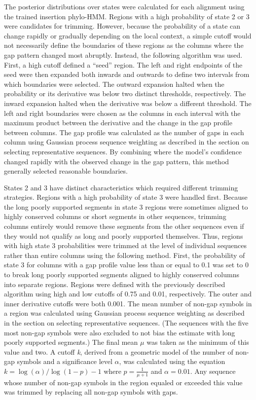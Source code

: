 The posterior distributions over states were calculated for each alignment using the trained insertion phylo-HMM. Regions with a high probability of state 2 or 3 were candidates for trimming. However, because the probability of a state can change rapidly or gradually depending on the local context, a simple cutoff would not necessarily define the boundaries of these regions as the columns where the gap pattern changed most abruptly. Instead, the following algorithm was used. First, a high cutoff defined a ``seed'' region. The left and right endpoints of the seed were then expanded both inwards and outwards to define two intervals from which boundaries were selected. The outward expansion halted when the probability or its derivative was below two distinct thresholds, respectively. The inward expansion halted when the derivative was below a different threshold. The left and right boundaries were chosen as the columns in each interval with the maximum product between the derivative and the change in the gap profile between columns. The gap profile was calculated as the number of gaps in each column using Gaussian process sequence weighting as described in the section on selecting representative sequences. By combining where the model’s confidence changed rapidly with the observed change in the gap pattern, this method generally selected reasonable boundaries.

 States 2 and 3 have distinct characteristics which required different trimming strategies. Regions with a high probability of state 3 were handled first. Because the long poorly supported segments in state 3 regions were sometimes aligned to highly conserved columns or short segments in other sequences, trimming columns entirely would remove these segments from the other sequences even if they would not qualify as long and poorly supported themselves. Thus, regions with high state 3 probabilities were trimmed at the level of individual sequences rather than entire columns using the following method. First, the probability of state 3 for columns with a gap profile value less than or equal to 0.1 was set to 0 to break long poorly supported segments aligned to highly conserved columns into separate regions. Regions were defined with the previously described algorithm using high and low cutoffs of 0.75 and 0.01, respectively. The outer and inner derivative cutoffs were both 0.001. The mean number of non-gap symbols in a region was calculated using Gaussian process sequence weighting as described in the section on selecting representative sequences. (The sequences with the five most non-gap symbols were also excluded to not bias the estimate with long poorly supported segments.) The final mean $\mu$ was taken as the minimum of this value and two. A cutoff \textit{k}, derived from a geometric model of the number of non-gap symbols and a significance level $\alpha$, was calculated using the equation $k = \log(\alpha) / \log(1 - p) - 1$ where $p = \frac{1}{\mu + 1}$ and $\alpha = 0.01$. Any sequence whose number of non-gap symbols in the region equaled or exceeded this value was trimmed by replacing all non-gap symbols with gaps.

